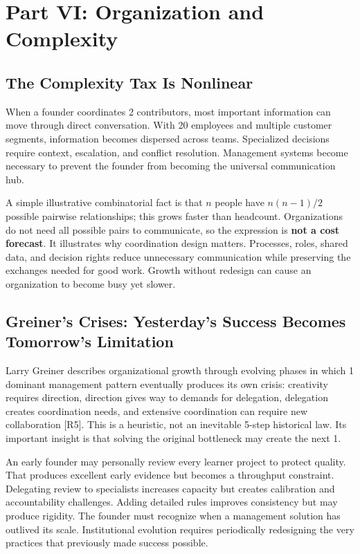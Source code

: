 \section*{Part VI: Organization and Complexity}
\label{sec:part6_organization_and_complexity}

\subsection{The Complexity Tax Is Nonlinear}
\label{sec:complexity_tax_nonlinear}

When a founder coordinates 2 contributors, most important information can move through direct conversation. With 20 employees and multiple customer segments, information becomes dispersed across teams. Specialized decisions require context, escalation, and conflict resolution. Management systems become necessary to prevent the founder from becoming the universal communication hub.

A simple illustrative combinatorial fact is that $n$ people have $n(n-1)/2$ possible pairwise relationships; this grows faster than headcount. Organizations do not need all possible pairs to communicate, so the expression is \textbf{not a cost forecast}. It illustrates why coordination design matters. Processes, roles, shared data, and decision rights reduce unnecessary communication while preserving the exchanges needed for good work. Growth without redesign can cause an organization to become busy yet slower.

\subsection{Greiner's Crises: Yesterday's Success Becomes Tomorrow's Limitation}
\label{sec:greiners_crises}

Larry Greiner describes organizational growth through evolving phases in which 1 dominant management pattern eventually produces its own crisis: creativity requires direction, direction gives way to demands for delegation, delegation creates coordination needs, and extensive coordination can require new collaboration [R5]. This is a heuristic, not an inevitable 5-step historical law. Its important insight is that solving the original bottleneck may create the next 1.

An early founder may personally review every learner project to protect quality. That produces excellent early evidence but becomes a throughput constraint. Delegating review to specialists increases capacity but creates calibration and accountability challenges. Adding detailed rules improves consistency but may produce rigidity. The founder must recognize when a management solution has outlived its scale. Institutional evolution requires periodically redesigning the very practices that previously made success possible.

